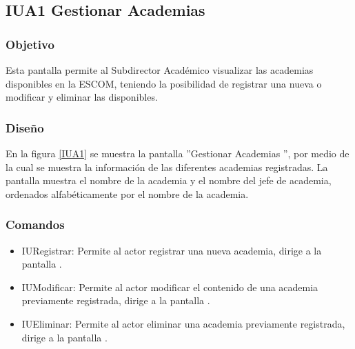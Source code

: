 \subsection{IUA1 Gestionar Academias}

\subsubsection{Objetivo}
	
Esta pantalla permite al Subdirector Académico visualizar las academias disponibles en la ESCOM, teniendo la posibilidad de registrar una nueva o modificar y eliminar las disponibles.

\subsubsection{Diseño}

    En la figura \ref{IUA1} se muestra la pantalla ''Gestionar Academias '', por medio de la cual se muestra la información de las diferentes academias registradas. La pantalla muestra el nombre de la academia y el nombre del jefe de academia, ordenados alfabéticamente por el nombre de la academia.
 

\subsubsection{Comandos}
    \begin{itemize}
	\item IURegistrar: Permite al actor registrar una nueva academia, dirige a la pantalla .
	
	\item IUModificar: Permite al actor modificar el contenido de una academia previamente registrada, dirige a la pantalla .
	
	\item IUEliminar: Permite al actor eliminar una academia previamente registrada, dirige a la pantalla .
    \end{itemize}
